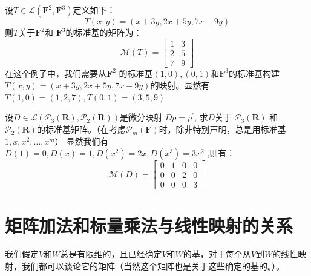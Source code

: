 \documentclass[10pt,a4paper,UTF8]{article}
\begin{document}
\begin{instance}
设\(T\in \mathcal{L}( \mathbf{F}^{2}, \mathbf{F}^{3})\)定义如下：
\[T(x,y) = (x+3y,2x+5y,7x+9y)\]
则\(T\)关于\(\mathbf{F}^{2}\)和 \(\mathbf{F}^{3}\)的标准基的矩阵为：
\begin{equation}
\label{eq:1}
\mathcal{M}(T) = 
\begin{bmatrix}
1 & 3 \\
2 & 5 \\
7 & 9
\end{bmatrix}
\end{equation}
在这个例子中，我们需要从\(\mathbf{F}^{2}\) 的标准基\((1,0),(0,1)\)和\(\mathbf{F}^{3}\)的标准基构建\(T(x,y) = (x+3y,2x+5y,7x+9y)\)的映射。显然有\(T(1,0) = (1,2,7),T(0,1) = (3,5,9)\) 
\end{instance}

\begin{instance}
设\(D\in \mathcal{L}( \mathcal{P}_{3}( \mathbf{R}), \mathcal{P}_{2}( \mathbf{R}))\)是微分映射 \(Dp = p^{'}\), 求\(D\)关于 \(\mathcal{P}_{3}( \mathbf{R})\) 和 \(\mathcal{P}_{2}( \mathbf{R})\)的标准基矩阵。（在考虑\(\mathcal{P}_{m}( \mathbf{F})\)时，除非特别声明，总是用标准基\(1,x,x^{2},\ldots ,x^{m}\)）
显然我们有 \(D(1) = 0, D(x) = 1, D(x^{2}) = 2x,D(x^{3}) = 3x^{2}\) ,则有：
\begin{equation}
\label{eq:3}
\mathcal{M}(D) = 
\begin{bmatrix}
0 & 1 & 0 & 0 \\
0 & 0 & 2 & 0 \\
0 & 0 & 0 & 3
\end{bmatrix}
\end{equation}
\end{instance}




\section{矩阵加法和标量乘法与线性映射的关系}
\label{sec:org6ead70b}


我们假定\(V\)和\(W\)总是有限维的，且已经确定\(V\)和\(W\)的基，对于每个从\(V\)到\(W\)的线性映射，我们都可以谈论它的矩阵（当然这个矩阵也是关于这些确定的基的。）。
\end{document}

